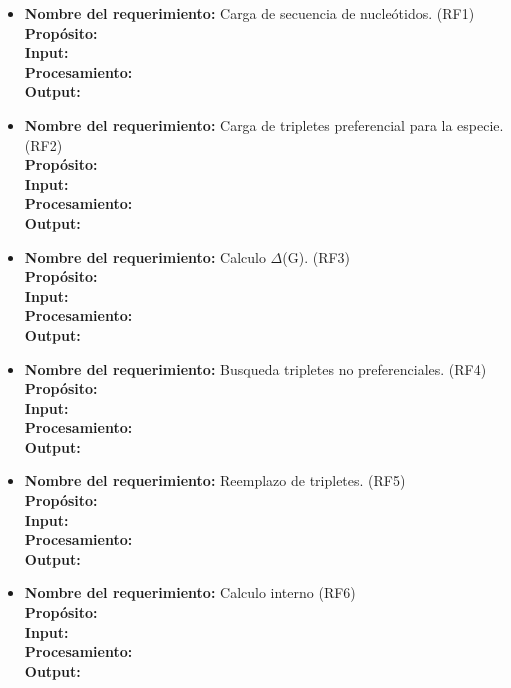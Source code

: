\documentclass[10pt,a4paper,english,spanish]{article}
\begin{document}
	\begin{itemize}
		\item \textbf{Nombre del requerimiento:} Carga de secuencia de nucleótidos. (RF1)\\
			  \textbf{Propósito:} \\
			  \textbf{Input:} \\
			  \textbf{Procesamiento:} \\
			  \textbf{Output:} \\

		\item \textbf{Nombre del requerimiento:} Carga de tripletes preferencial para la especie. (RF2)\\
			  \textbf{Propósito:} \\
			  \textbf{Input:} \\
			  \textbf{Procesamiento:} \\
			  \textbf{Output:} \\

		\item \textbf{Nombre del requerimiento:} Calculo $\Delta$(G). (RF3)\\
			  \textbf{Propósito:} \\
			  \textbf{Input:} \\
			  \textbf{Procesamiento:} \\
			  \textbf{Output:} \\

		\item \textbf{Nombre del requerimiento:} Busqueda  tripletes no preferenciales. (RF4)\\
			  \textbf{Propósito:} \\
			  \textbf{Input:} \\
			  \textbf{Procesamiento:} \\
			  \textbf{Output:} \\

		\item \textbf{Nombre del requerimiento:} Reemplazo de tripletes. (RF5)\\
			  \textbf{Propósito:} \\
			  \textbf{Input:} \\
			  \textbf{Procesamiento:} \\
			  \textbf{Output:} \\

		\item \textbf{Nombre del requerimiento:} Calculo interno (RF6)\\
			  \textbf{Propósito:} \\
			  \textbf{Input:} \\
			  \textbf{Procesamiento:} \\
			  \textbf{Output:} \\


\end{itemize}
\end{document}
